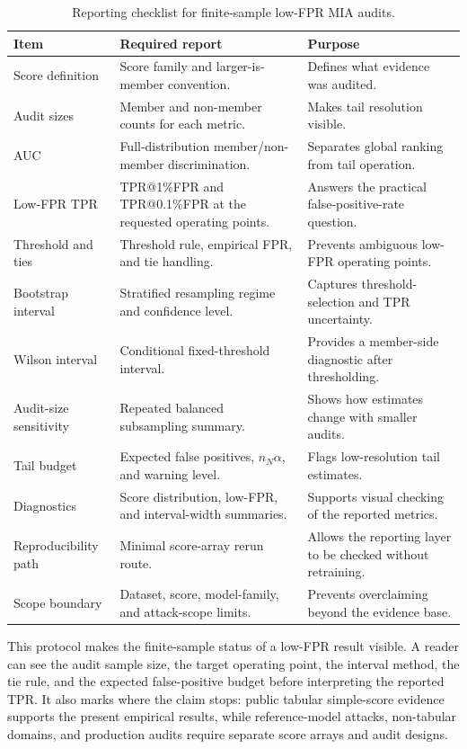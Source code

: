 \documentclass[
  10pt,
  twocolumn]{article}
\begin{document}
\begin{table}[t]
\centering
\scriptsize
\caption{Reporting checklist for finite-sample low-FPR MIA audits.}
\label{tab:reporting-checklist}
\setlength{\tabcolsep}{4pt}
\begin{tabularx}{\textwidth}{@{}p{} X X@{}}
\toprule
Item & Required report & Purpose \\
\midrule
Score definition & Score family and larger-is-member convention. & Defines what evidence was audited. \\
Audit sizes & Member and non-member counts for each metric. & Makes tail resolution visible. \\
AUC & Full-distribution member/non-member discrimination. & Separates global ranking from tail operation. \\
Low-FPR TPR & TPR@1\%FPR and TPR@0.1\%FPR at the requested operating points. & Answers the practical false-positive-rate question. \\
Threshold and ties & Threshold rule, empirical FPR, and tie handling. & Prevents ambiguous low-FPR operating points. \\
Bootstrap interval & Stratified resampling regime and confidence level. & Captures threshold-selection and TPR uncertainty. \\
Wilson interval & Conditional fixed-threshold interval. & Provides a member-side diagnostic after thresholding. \\
Audit-size sensitivity & Repeated balanced subsampling summary. & Shows how estimates change with smaller audits. \\
Tail budget & Expected false positives, $n_N\alpha$, and warning level. & Flags low-resolution tail estimates. \\
Diagnostics & Score distribution, low-FPR, and interval-width summaries. & Supports visual checking of the reported metrics. \\
Reproducibility path & Minimal score-array rerun route. & Allows the reporting layer to be checked without retraining. \\
Scope boundary & Dataset, score, model-family, and attack-scope limits. & Prevents overclaiming beyond the evidence base. \\
\bottomrule
\end{tabularx}
\end{table}

This protocol makes the finite-sample status of a low-FPR result visible. A reader can see the audit sample size, the target operating point, the interval method, the tie rule, and the expected false-positive budget before interpreting the reported TPR. It also marks where the claim stops: public tabular simple-score evidence supports the present empirical results, while reference-model attacks, non-tabular domains, and production audits require separate score arrays and audit designs.
\end{document}
